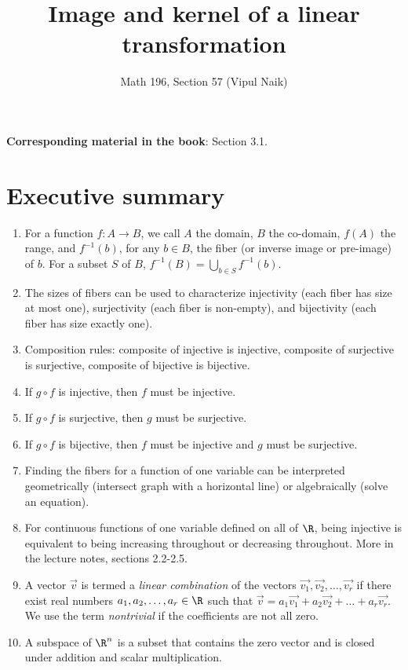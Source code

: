 \documentclass[10pt]{amsart}
\title{Image and kernel of a linear transformation}
\author{Math 196, Section 57 (Vipul Naik)}
\begin{document}
\maketitle

{\bf Corresponding material in the book}: Section 3.1.

\section*{Executive summary}

\begin{enumerate}
\item For a function $f:A \to B$, we call $A$ the domain, $B$ the
  co-domain, $f(A)$ the range, and $f^{-1}(b)$, for any $b \in B$, the
  fiber (or inverse image or pre-image) of $b$. For a subset $S$ of
  $B$, $f^{-1}(B) = \bigcup_{b \in S} f^{-1}(b)$.
\item The sizes of fibers can be used to characterize injectivity
  (each fiber has size at most one), surjectivity (each fiber is
  non-empty), and bijectivity (each fiber has size exactly one).
\item Composition rules: composite of injective is injective,
  composite of surjective is surjective, composite of bijective is
  bijective.
\item If $g \circ f$ is injective, then $f$ must be injective.
\item If $g \circ f$ is surjective, then $g$ must be surjective.
\item If $g \circ f$ is bijective, then $f$ must be injective and $g$
  must be surjective.
\item Finding the fibers for a function of one variable can be
  interpreted geometrically (intersect graph with a horizontal line)
  or algebraically (solve an equation).
\item For continuous functions of one variable defined on all of $\R$,
  being injective is equivalent to being increasing throughout or
  decreasing throughout. More in the lecture notes, sections 2.2-2.5.
\item A vector $\vec{v}$ is termed a {\em linear combination} of the
  vectors $\vec{v_1}, \vec{v_2}, \dots, \vec{v_r}$ if there exist real
  numbers $a_1,a_2,\dots,a_r \in \R$ such that $\vec{v} = a_1\vec{v_1}
  + a_2\vec{v_2} + \dots + a_r\vec{v_r}$. We use the term {\em
    nontrivial} if the coefficients are not all zero.
\item A subspace of $\R^n$ is a subset that contains the zero vector
  and is closed under addition and scalar multiplication.

\end{enumerate}
\end{document}
